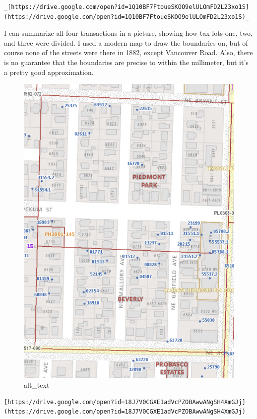 \documentclass[
  12pt,
]{book}
\begin{document}
\begin{verbatim}
_[https://drive.google.com/open?id=1Q10BF7FtoueSKOO9elULOmFD2L23xo1S](https://drive.google.com/open?id=1Q10BF7FtoueSKOO9elULOmFD2L23xo1S)_
\end{verbatim}

I can summarize all four transactions in a picture, showing how tax lots one, two, and three were divided. I used a modern map to draw the boundaries on, but of course none of the streets were there in 1882, except Vancouver Road. Also, there is no guarantee that the boundaries are precise to within the millimeter, but it's a pretty good approximation.

\begin{figure}
\centering
\includegraphics{images/0202a_images/image3.png}
\caption{alt\_text}
\end{figure}

\begin{verbatim}
[https://drive.google.com/open?id=18J7V0CGXE1adVcPZOBAwwANgSH4XmGJj](https://drive.google.com/open?id=18J7V0CGXE1adVcPZOBAwwANgSH4XmGJj)
\end{verbatim}
\end{document}
